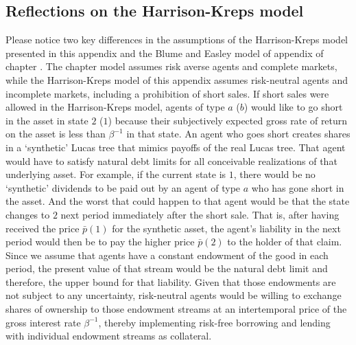 \subsection{Reflections on the Harrison-Kreps model}

Please notice two 
key differences in the assumptions of the Harrison-Kreps model presented in this appendix and the Blume and Easley model of appendix  of chapter .
The chapter  model assumes risk averse agents
and complete markets, while
the  Harrison-Kreps model of this appendix assumes 
risk-neutral agents and incomplete markets, including
a prohibition of short sales.  
If short sales were allowed in the Harrison-Kreps model,
agents of type $a$ ($b$) would like to go short in the 
asset in state $2$ ($1$) because  their
subjectively expected gross rate 
of return on the asset is less than $\beta^{-1}$ in that state. An
agent who goes short  creates shares in 
a `synthetic' Lucas tree that mimics  payoffs of 
the real Lucas tree. That agent would have
to satisfy  natural debt limits for all conceivable
realizations of that underlying asset. 
For example, if the current state is $1$, there
would be no `synthetic' dividends to be paid out by an 
agent of type $a$ who has gone short in the asset. 
And the worst that could happen to that agent would 
be that the state  changes to $2$  next period immediately
after the short sale. That is, after having
received the price $\bar p(1)$ for the synthetic
asset, the agent's liability in the next period
would then be to pay the higher price $\bar p(2)$ 
to the holder of that claim. Since we assume that
agents have a constant endowment of
the good in each period, the present value of that
stream would be the natural debt limit and therefore, 
the upper bound for that liability. Given that those 
endowments are not subject to any uncertainty, 
risk-neutral agents would be willing to exchange 
shares of ownership to those endowment streams at 
an intertemporal price of the gross interest rate 
$\beta^{-1}$, thereby implementing risk-free
borrowing and lending with individual endowment 
streams as collateral.

